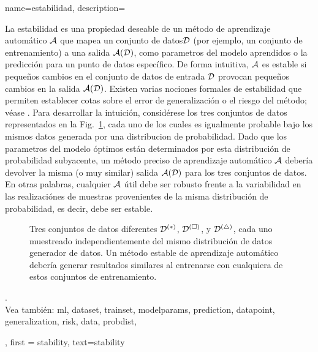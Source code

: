 	 
{name={estabilidad},
	description={
		La estabilidad es una propiedad deseable de un método de aprendizaje automático $\mathcal{A}$ que mapea un 
		conjunto de datos$\mathcal{D}$ (por ejemplo, un conjunto de entrenamiento) a una salida $\mathcal{A}(\mathcal{D})$, como 
		parametros del modelo aprendidos o la predicción para un punto de datos específico. De forma intuitiva, 
		$\mathcal{A}$ es estable si pequeños cambios en el conjunto de datos de entrada $\mathcal{D}$ provocan pequeños 
		cambios en la salida $\mathcal{A}(\mathcal{D})$. Existen varias nociones formales de estabilidad que permiten 
		establecer cotas sobre el error de generalización o el riesgo del método; véase \cite[Cap.~13]{ShalevMLBook}.
		Para desarrollar la intuición, considérese los tres conjuntos de datos representados en la 
		Fig.~\ref{fig_three_data_stability}, cada uno de los cuales es igualmente probable bajo los mismos datos
		generada por una distribucion de probabilidad. Dado que los parametros del modelo óptimos están determinados por esta 
		distribución de probabilidad subyacente, un método preciso de aprendizaje automático $\mathcal{A}$ debería devolver la misma (o muy similar) 
		salida $\mathcal{A}(\mathcal{D})$ para los tres conjuntos de datos. En otras palabras, cualquier $\mathcal{A}$ útil debe ser 
		robusto frente a la variabilidad en las realizaciónes de muestras provenientes de la misma distribución de probabilidad, 
		es decir, debe ser estable. 
		\begin{figure}[H]
			\centering
			\caption{Tres conjuntos de datos diferentes $\mathcal{D}^{(*)}$, $\mathcal{D}^{(\square)}$, y $\mathcal{D}^{(\triangle)}$, 
				cada uno muestreado independientemente del mismo distribución de datos generador de datos. Un método estable de aprendizaje automático 
				debería generar resultados similares al entrenarse con cualquiera de estos conjuntos de entrenamiento. \label{fig_three_data_stability}}
		\end{figure}.
		\\
		Vea también: \gls{ml}, \gls{dataset}, \gls{trainset}, \gls{modelparams}, \gls{prediction}, \gls{datapoint}, \gls{generalization}, \gls{risk}, \gls{data}, \gls{probdist},   }, 
	first = {stability}, text={stability} 
}

